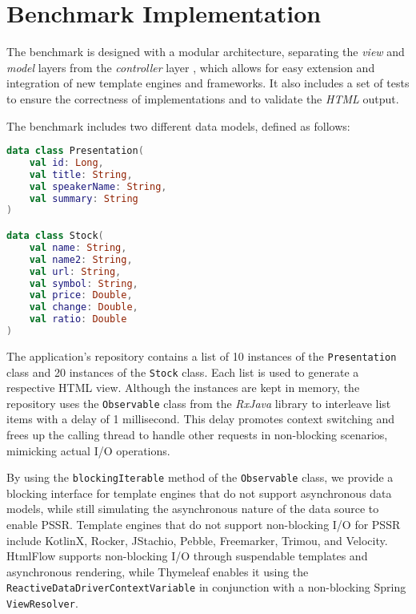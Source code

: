 \section{Benchmark Implementation}

The benchmark is designed with a modular architecture, separating the
\textit{view} and \textit{model} layers from the \textit{controller} layer
\citeauthor{Bucanek2009}, which allows for easy extension and integration of new
template engines and frameworks. It also includes a set of tests to ensure the
correctness of implementations and to validate the \textit{HTML} output.

The benchmark includes two different data models, defined as follows:


\lstset{style=listingstyle}

\begin{lstlisting}[language=Kotlin, caption={Data Models}, label={lst:data-models}]
data class Presentation(
    val id: Long,
    val title: String, 
    val speakerName: String,
    val summary: String
)

data class Stock(
    val name: String,
    val name2: String,
    val url: String,
    val symbol: String,
    val price: Double, 
    val change: Double, 
    val ratio: Double
)
\end{lstlisting}

The application's repository contains a list of 10 instances of the
\texttt{Presentation} class and 20 instances of the \texttt{Stock} class. Each list is used
to generate a respective HTML view. Although the instances are kept in memory,
the repository uses the \texttt{Observable} class from the \textit{RxJava}
library to interleave list items with a delay of 1 millisecond. This delay
promotes context switching and frees up the calling thread to handle other
requests in non-blocking scenarios, mimicking actual I/O operations.

By using the \texttt{blockingIterable} method of the \texttt{Observable}
class, we provide a blocking interface for template engines that do not support
asynchronous data models, while still simulating the asynchronous nature of the
data source to enable PSSR\@. Template engines that do not support non-blocking
I/O for PSSR include KotlinX, Rocker, JStachio, Pebble, Freemarker, Trimou, and
Velocity. HtmlFlow supports non-blocking I/O through suspendable templates and
asynchronous rendering, while Thymeleaf enables it using the
\texttt{ReactiveDataDriverContextVariable} in conjunction with a non-blocking
Spring \texttt{ViewResolver}.

